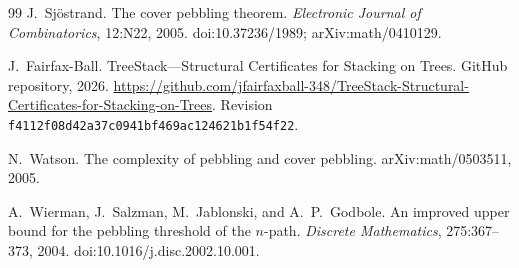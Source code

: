 \documentclass[11pt]{article}
\begin{document}
\begin{thebibliography}{99}
J.~Sj\"ostrand.
\newblock The cover pebbling theorem.
\newblock \emph{Electronic Journal of Combinatorics}, 12:N22, 2005.
\newblock doi:10.37236/1989; arXiv:math/0410129.

J.~Fairfax-Ball.
\newblock TreeStack---Structural Certificates for Stacking on Trees.
\newblock GitHub repository, 2026.
\newblock \url{https://github.com/jfairfaxball-348/TreeStack-Structural-Certificates-for-Stacking-on-Trees}.
\newblock Revision \texttt{f4112f08d42a37c0941bf469ac124621b1f54f22}.

N.~Watson.
\newblock The complexity of pebbling and cover pebbling.
\newblock arXiv:math/0503511, 2005.

A.~Wierman, J.~Salzman, M.~Jablonski, and A.~P.~Godbole.
\newblock An improved upper bound for the pebbling threshold of the $n$-path.
\newblock \emph{Discrete Mathematics}, 275:367--373, 2004.
\newblock doi:10.1016/j.disc.2002.10.001.

\end{thebibliography}
\end{document}
